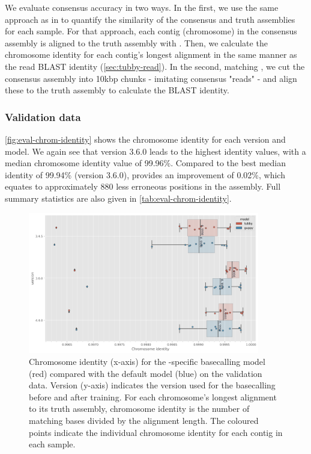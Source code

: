 We evaluate consensus accuracy in two ways. In the first, we use the same approach as in \cite{wick2020} to quantify the similarity of the consensus and truth assemblies for each sample. For that approach, each contig (chromosome) in the consensus assembly is aligned to the truth assembly with . Then, we calculate the chromosome identity for each contig's longest alignment in the same manner as the read BLAST identity (\autoref{sec:tubby-read}). In the second, matching \cite{wick2019}, we cut the consensus assembly into 10kbp chunks - imitating consensus "reads" - and align these to the truth assembly to calculate the BLAST identity. 

\subsubsection{Validation data}

\autoref{fig:eval-chrom-identity} shows the chromosome identity for each version and model. We again see that \tubby{} version 3.6.0 leads to the highest identity values, with a median chromosome identity value of 99.96\%. Compared to the best median \guppy{} identity of 99.94\% (version 3.6.0), \tubby{} provides an improvement of 0.02\%, which equates to approximately 880 less erroneous positions in the \mtb{} assembly. Full summary statistics are also given in \autoref{tab:eval-chrom-identity}.

\begin{figure}
\includegraphics[width=0.9\textwidth]{Chapter4/Figs/eval_chromosome_identity.png}
\centering
\caption{Chromosome identity (x-axis) for the \mtb{}-specific basecalling model \tubby{} (red) compared with the default \guppy{} model (blue) on the validation data. Version (y-axis) indicates the \guppy{} version used for the basecalling before and after training. For each chromosome's longest alignment to its truth assembly, chromosome identity is the number of matching bases divided by the alignment length. The coloured points indicate the individual chromosome identity for each contig in each sample.}
\label{fig:eval-chrom-identity}
\end{figure}

